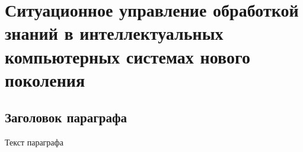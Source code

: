 \chapter{Ситуационное управление обработкой знаний в интеллектуальных компьютерных системах нового поколения}
\label{chapter_situation_management}


\section{Заголовок параграфа}
Текст параграфа

%